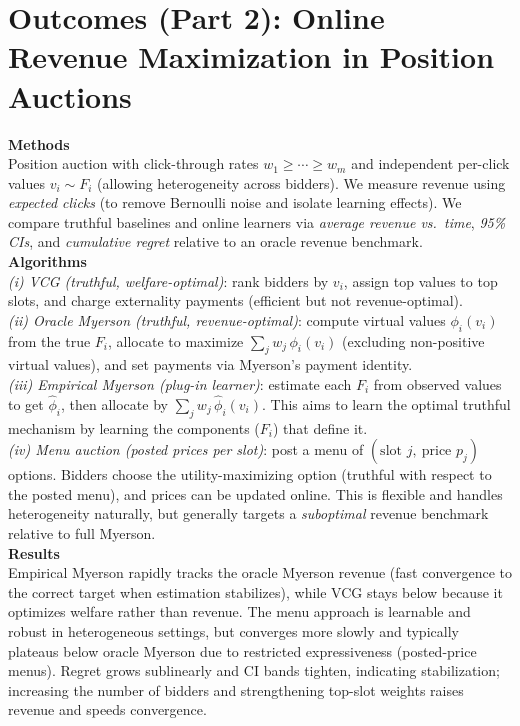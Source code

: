 \documentclass[10pt]{article}
\renewenvironment{shaded}{%
  \def\FrameCommand{\fboxsep=\FrameSep \colorbox{shadecolor}}%
  \MakeFramed{\advance\hsize-\width \FrameRestore\FrameRestore}}%
 {\endMakeFramed}
\begin{document}
\section{Outcomes (Part 2): Online Revenue Maximization in Position Auctions}
\begin{shaded}
\textbf{Methods}\\
Position auction with click-through rates $w_1\ge \cdots \ge w_m$ and independent per-click values $v_i\sim F_i$ (allowing heterogeneity across bidders). We measure revenue using \emph{expected clicks} (to remove Bernoulli noise and isolate learning effects). We compare truthful baselines and online learners via \emph{average revenue vs.\ time}, \emph{95\% CIs}, and \emph{cumulative regret} relative to an oracle revenue benchmark.\\[0.6em]

\textbf{Algorithms}\\
\emph{(i) VCG (truthful, welfare-optimal)}: rank bidders by $v_i$, assign top values to top slots, and charge externality payments (efficient but not revenue-optimal).\\
\emph{(ii) Oracle Myerson (truthful, revenue-optimal)}: compute virtual values $\phi_i(v_i)$ from the true $F_i$, allocate to maximize $\sum_j w_j\,\phi_i(v_i)$ (excluding non-positive virtual values), and set payments via Myerson’s payment identity.\\
\emph{(iii) Empirical Myerson (plug-in learner)}: estimate each $F_i$ from observed values to get $\hat\phi_i$, then allocate by $\sum_j w_j\,\hat\phi_i(v_i)$. This aims to learn the optimal truthful mechanism by learning the components ($F_i$) that define it.\\
\emph{(iv) Menu auction (posted prices per slot)}: post a menu of $(\text{slot }j,\ \text{price }p_j)$ options. Bidders choose the utility-maximizing option (truthful with respect to the posted menu), and prices can be updated online. This is flexible and handles heterogeneity naturally, but generally targets a \emph{suboptimal} revenue benchmark relative to full Myerson.\\[0.6em]

\textbf{Results}\\
Empirical Myerson rapidly tracks the oracle Myerson revenue (fast convergence to the correct target when estimation stabilizes), while VCG stays below because it optimizes welfare rather than revenue. The menu approach is learnable and robust in heterogeneous settings, but converges more slowly and typically plateaus below oracle Myerson due to restricted expressiveness (posted-price menus). Regret grows sublinearly and CI bands tighten, indicating stabilization; increasing the number of bidders and strengthening top-slot weights raises revenue and speeds convergence.\\[0.6em]


\end{shaded}
\end{document}
